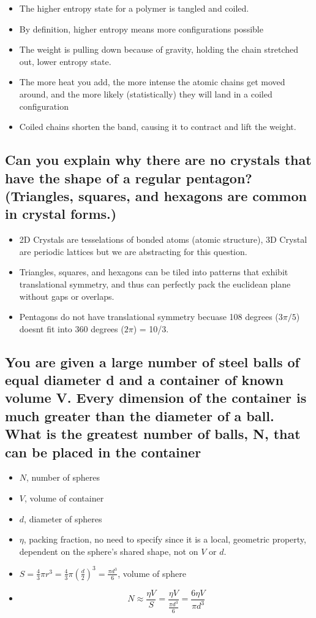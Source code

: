 \documentclass{article}
\begin{document}
\begin{itemize}
    \item The higher entropy state for a polymer is tangled and coiled.
    \item By definition, higher entropy means more configurations possible
    \item The weight is pulling down because of gravity, holding the chain stretched out, lower entropy state.
    \item The more heat you add, the more intense the atomic chains get moved around, and the more likely (statistically) they will land in a coiled configuration
    \item Coiled chains shorten the band, causing it to contract and lift the weight.
\end{itemize}

\subsection{Can you explain why there are no crystals that have the shape of a regular pentagon? (Triangles, squares, and hexagons are common in crystal forms.)}

\begin{itemize}
    \item 2D Crystals are tesselations of bonded atoms (atomic structure), 3D Crystal are periodic lattices but we are abstracting for this question.
    \item Triangles, squares, and hexagons can be tiled into patterns that exhibit translational symmetry, and thus can perfectly pack the euclidean plane without gaps or overlaps.
    \item Pentagons do not have translational symmetry becuase 108 degrees ($3\pi/5$) doesnt fit into 360 degrees ($2\pi$) = 10/3.
\end{itemize}

\subsection{You are given a large number of steel balls of equal diameter d and a container of known volume V. Every dimension of the container is much greater than the diameter of a ball. What is the greatest number of balls, N, that can be placed in the container}

\begin{itemize}
    \item $N$, number of spheres
    \item $V$, volume of container
    \item $d$, diameter of spheres
    \item $\eta$, packing fraction, no need to specify since it is a local, geometric property, dependent on the sphere's shared shape, not on $V$ or $d$.
    \item $S = \frac{4}{3}\pi r^3 = \frac{4}{3}\pi\left(\frac{d}{2}\right)^3 = \frac{\pi d^3}{6}$, volume of sphere
    \item $$N \approx \frac{\eta V}{S} = \frac{\eta V}{\frac{\pi d^3}{6}} = \frac{6\eta V}{\pi d^3}$$
\end{itemize}
\end{document}
